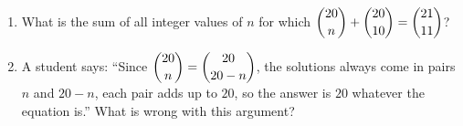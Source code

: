 \begin{enumerate}
\item[(a)] What is the sum of all integer values of $n$ for which $\dbinom{20}{n}+\dbinom{20}{10}=\dbinom{21}{11}$?
\item[(b)] A student says: ``Since $\dbinom{20}{n}=\dbinom{20}{20-n}$, the solutions always come in pairs $n$ and $20-n$, each pair adds up to $20$, so the answer is $20$ whatever the equation is.'' What is wrong with this argument?
\end{enumerate}
